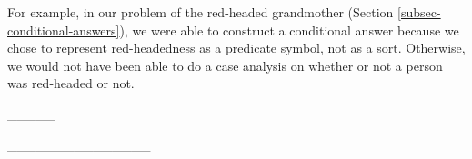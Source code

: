 For example, in our problem of the
red-headed grandmother (Section \ref{subsec-conditional-answers}), we
were able to construct a conditional answer because we chose to
represent red-headedness as a predicate symbol, not as a sort.
Otherwise, we would not have been able to do a case analysis on
whether or not a person was red-headed or not.




_____



_______________

